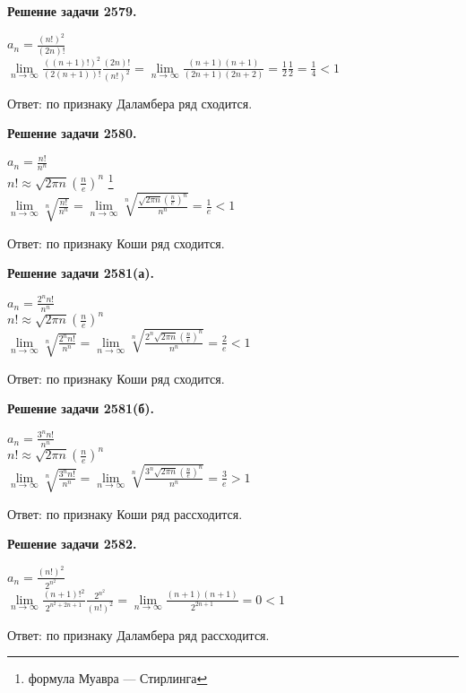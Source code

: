 \documentclass[a4paper,12pt]{article}
\newenvironment{problem}[1]{\par\bigskip\noindent\textbf{Решение задачи #1.}
  \enskip\ignorespaces}{}
\begin{document}
  \begin{problem}{2579}

    $a_n = \frac{(n!)^2}{(2n)!}$ \\
    $\lim\limits_{n \to \infty} \frac{((n+1)!)^2}{(2(n+1))!}
    \frac{(2n)!}{(n!)^2} = \lim\limits_{n \to \infty} 
    \frac{(n+1)(n+1)}{(2n+1)(2n+2)} = \frac{1}{2} \frac{1}{2} = \frac{1}{4} < 1$

    Ответ: по признаку Даламбера ряд сходится.
  \end{problem}

  \begin{problem}{2580}

    $a_n = \frac{n!}{n^n}$ \\
    $n! \approx \sqrt{2\pi n} \left( \frac{n}{e} \right) ^n$ 
    \footnote{формула Муавра — Стирлинга} \\
    $\lim\limits_{n \to \infty} \sqrt[n]{\frac{n!}{n^n}}
    = \lim\limits_{n \to \infty} 
    \sqrt[n]{\frac{\sqrt{2\pi n} \left( \frac{n}{e} \right) ^n}{n^n}}
    = \frac{1}{e} < 1$

    Ответ: по признаку Коши ряд сходится.
  \end{problem}
  
  \begin{problem}{2581(а)}
    
    $a_n = \frac{2^nn!}{n^n}$ \\
    $n! \approx \sqrt{2\pi n} \left( \frac{n}{e} \right) ^n$ \\
    $\lim\limits_{n \to \infty} \sqrt[n]{\frac{2^nn!}{n^n}}
    = \lim\limits_{n \to \infty} 
    \sqrt[n]{\frac{2^n\sqrt{2\pi n} \left( \frac{n}{e} \right) ^n}{n^n}}
    = \frac{2}{e} < 1$

    Ответ: по признаку Коши ряд сходится.
  \end{problem}

  \begin{problem}{2581(б)}
    
    $a_n = \frac{3^nn!}{n^n}$ \\
    $n! \approx \sqrt{2\pi n} \left( \frac{n}{e} \right) ^n$ \\
    $\lim\limits_{n \to \infty} \sqrt[n]{\frac{3^nn!}{n^n}}
    = \lim\limits_{n \to \infty} 
    \sqrt[n]{\frac{3^n\sqrt{2\pi n} \left( \frac{n}{e} \right) ^n}{n^n}}
    = \frac{3}{e} > 1$

    Ответ: по признаку Коши ряд рассходится.
  \end{problem}

  \begin{problem}{2582}

    $a_n = \frac{(n!)^2}{2^{n^2}}$ \\
    $\lim\limits_{n \to \infty} \frac{(n+1)!^2}{2^{n^2 + 2n + 1}}
    \frac{2^{n^2}}{(n!)^2}
    = \lim\limits_{n \to \infty} \frac{(n+1)(n+1)}{2^{2n+1}} = 0 < 1$

    Ответ: по признаку Даламбера ряд рассходится.
  \end{problem}
\end{document}

